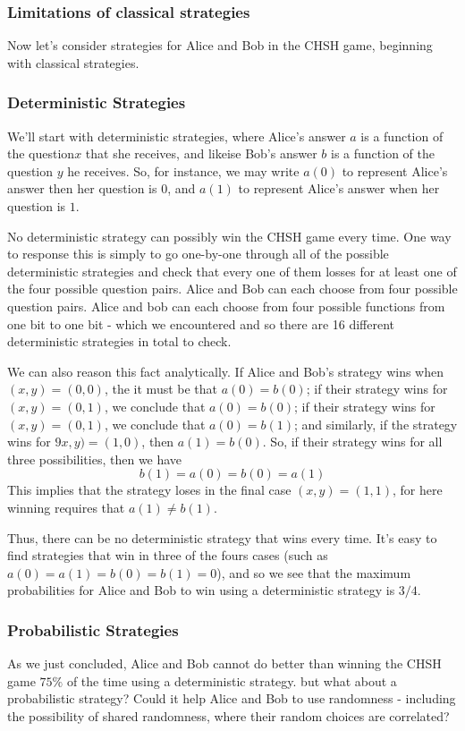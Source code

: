 \subsubsection{Limitations of classical strategies}
Now let's consider strategies for Alice and Bob in the CHSH game, beginning with classical strategies.

\subsubsection{Deterministic Strategies}
We'll start with deterministic strategies, where Alice's answer $a$ is a function of the question$x$ that she receives, and likeise Bob's answer $b$ is a function of the question $y$ he receives. So, for instance, we may write $a(0)$ to represent Alice's answer then her question is $0$, and $a(1)$ to represent Alice's answer when her question is $1$.

No deterministic strategy can possibly win the CHSH game every time. One way to response this is simply to go one-by-one through all of the possible deterministic strategies and check that every one of them losses for at least one of the four possible question pairs. Alice and Bob can each choose from four possible question pairs. Alice and bob can each choose from four possible functions from one bit to one bit - which we encountered and so there are 16 different deterministic strategies in total to check.

We can also reason this fact analytically. If Alice and Bob's strategy wins when $(x,y)=(0,0)$, the it must be that $a(0)=b(0)$; if their strategy wins for $(x,y)=(0,1)$, we conclude that $a(0)=b(0)$; if their strategy wins for $(x,y)=(0,1)$, we conclude that $a(0)=b(1)$; and similarly, if the strategy wins for $9x,y)=(1,0)$, then $a(1)=b(0)$. So, if their strategy wins for all three possibilities, then we have
\[
b(1)=a(0)=b(0)=a(1)
\]
This implies that the strategy loses in the final case $(x,y)=(1,1)$, for here winning requires that $a(1) \neq b(1)$.

Thus, there can be no deterministic strategy that wins every time. It's easy to find strategies that win in three of the fours cases (such as $a(0)=a(1)=b(0)=b(1)=0$), and so we see that the maximum probabilities for Alice and Bob to win using a deterministic strategy is $3/4$.

\subsubsection{Probabilistic Strategies}
As we just concluded, Alice and Bob cannot do better than winning the CHSH game $75\%$ of the time using a deterministic strategy. but what about a probabilistic strategy? Could it help Alice and Bob to use randomness - including the possibility of shared randomness, where their random choices are correlated?

